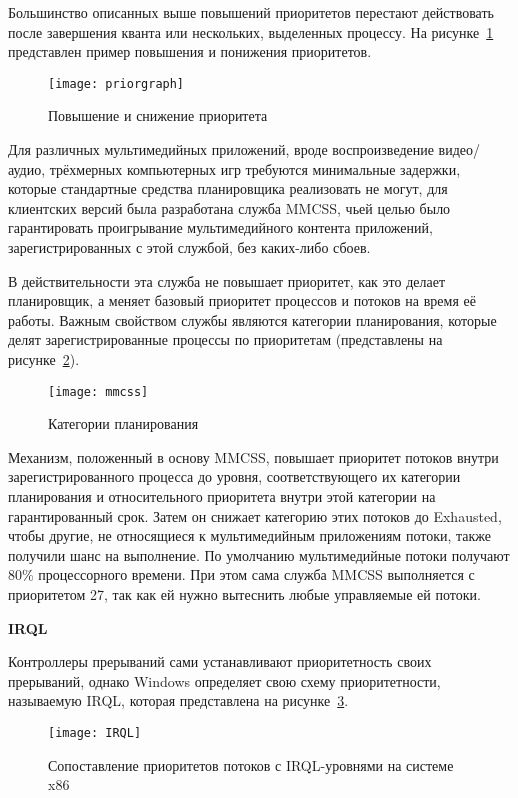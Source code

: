Большинство описанных выше повышений приоритетов перестают действовать после завершения кванта или нескольких, выделенных процессу. На рисунке~\ref{fig:priorgraph} представлен пример повышения и понижения приоритетов.

\begin{figure}[H]
	\centering
	\texttt{[image: priorgraph]}
	\caption{Повышение и снижение приоритета}
	\label{fig:priorgraph}
\end{figure}

Для различных мультимедийных приложений, вроде воспроизведение видео/аудио, трёхмерных компьютерных игр требуются минимальные задержки, которые стандартные средства планировщика реализовать не могут, для клиентских версий была разработана служба MMCSS, чьей целью было гарантировать проигрывание мультимедийного контента приложений, зарегистрированных с этой службой, без каких-либо сбоев.

В действительности эта служба не повышает приоритет, как это делает планировщик, а меняет базовый приоритет процессов и потоков на время её работы. Важным свойством службы являются категории планирования, которые делят зарегистрированные процессы по приоритетам (представлены на рисунке~\ref{fig:mmcss}).

\begin{figure}[H]
	\centering
	\texttt{[image: mmcss]}
	\caption{Категории планирования}
	\label{fig:mmcss}
\end{figure}

Механизм, положенный в основу MMCSS, повышает приоритет потоков внутри зарегистрированного процесса до уровня, соответствующего их категории планирования и относительного приоритета внутри этой категории на
гарантированный срок. Затем он снижает категорию этих потоков до Exhausted, чтобы другие, не относящиеся к мультимедийным приложениям потоки, также получили шанс на выполнение. По умолчанию мультимедийные потоки получают 80\% процессорного времени. При этом сама служба MMCSS выполняется с приоритетом 27, так как ей нужно вытеснить любые управляемые ей потоки.

\textbf{IRQL}

Контроллеры прерываний сами устанавливают приоритетность своих прерываний, однако Windows определяет свою схему приоритетности, называемую IRQL, которая представлена на рисунке~\ref{fig:IRQL}.

\begin{figure}[H]
	\centering
	\texttt{[image: IRQL]}
	\caption{Сопоставление приоритетов потоков с IRQL-уровнями на системе x86}
	\label{fig:IRQL}
\end{figure}

